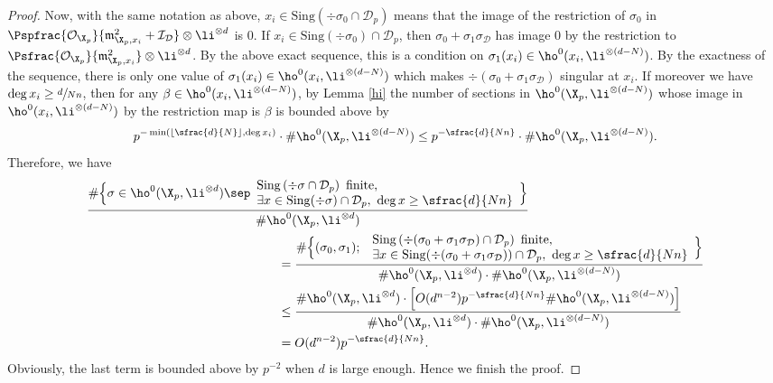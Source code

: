 \begin{proof}
Now, with the same notation as above, $x_i\in \mathrm{Sing}(\div \sigma_0\cap \mathcal{D}_p)$ means that the image of the restriction of $\sigma_0$ in $\Pspfrac{\mathcal{O}_{\X_p}}{\mathfrak{m}^2_{\X_p, x_i}+\mathcal{I}_{\mathcal{D}}}\otimes \li^{\otimes d}$ is $0$. If \hbox{$x_i\in \mathrm{Sing}(\div \sigma_0)\cap \mathcal{D}_p$}, then $\sigma_0+\sigma_1\sigma_{\mathcal{D}}$ has image 0 by the restriction to $\Psfrac{\mathcal{O}_{\X_p}}{\mathfrak{m}_{\X_p, x_i}^2}\otimes \li^{\otimes d}$. By the above exact sequence, this is a condition on $\sigma_1(x_i)\in\ho^0(x_i, \li^{\otimes (d-N)})$. By the exactness of the sequence, there is only one value of $\sigma_1(x_i)\in \ho^0(x_i, \li^{\otimes (d-N)})$ which makes $\div (\sigma_0+\sigma_1\sigma_{\mathcal{D}})$ singular at $x_i$. If moreover we have $\deg x_i \geq\sfrac{d}{Nn}$, then for any $\beta\in \ho^0(x_i, \li^{\otimes (d-N)})$, by Lemma \ref{hi} the number of sections in $\ho^0(\X_p, \li^{\otimes (d-N)})$ whose image in $\ho^0(x_i, \li^{\otimes (d-N)})$ by the restriction map is $\beta$ is bounded above by\vspace*{-3pt}
\[
p^{{-\min(\lfloor\sfrac{d}{N}\rfloor, \deg x_i)}}\cdot \#\ho^0(\X_p, \li^{\otimes (d-N)})\leq p^{-\sfrac{d}{Nn}}\cdot \#\ho^0(\X_p, \li^{\otimes (d-N)}).
\]
Therefore, we have\vspace*{-3pt}
\begin{align*}
\frac{\#\Bigl\{ \sigma\in \ho^0(\X_p, \li^{\otimes d})\sep \begin{array}{ll}
\mathrm{Sing}\left(\div \sigma \cap \mathcal{D}_p\right) \text{ finite,}\\ \exists x\in\mathrm{Sing}(\div \sigma)\cap \mathcal{D}_p,\ \deg x\geq \sfrac{d}{Nn}
\end{array} \Bigr\}}{\#\ho^0(\X_p, \li^{\otimes d})}&\\
&\hspace*{-7cm}=\frac{\#\Bigl\{ (\sigma_0,\sigma_1);\
\begin{array}{ll}
\mathrm{Sing}\left(\div (\sigma_0+\sigma_1\sigma_{\mathcal{D}})\cap \mathcal{D}_p\right) \text{ finite,}\\ \exists x\in\mathrm{Sing}(\div (\sigma_0+\sigma_1\sigma_{\mathcal{D}}))\cap \mathcal{D}_p,\ \deg x\geq \sfrac{d}{Nn}
\end{array}
\Bigr\}}{\#\ho^0(\X_p, \li^{\otimes d})\cdot \#\ho^0(\X_p, \li^{\otimes (d-N)})}\\
&\hspace*{-7cm}\leq \frac{\#\ho^0(\X_p, \li^{\otimes d})\cdot \left[O(d^{n-2}) p^{-\sfrac{d}{Nn}}\#\ho^0(\X_p, \li^{\otimes (d-N)})\right]}{\#\ho^0(\X_p, \li^{\otimes d})\cdot \#\ho^0(\X_p, \li^{\otimes (d-N)})}\\
&\hspace*{-7cm}=O(d^{n-2}) p^{-\sfrac{d}{Nn}}.
\end{align*}
Obviously, the last term is bounded above by $p^{-2}$ when $d$ is large enough. Hence we finish the proof.
\end{proof}

